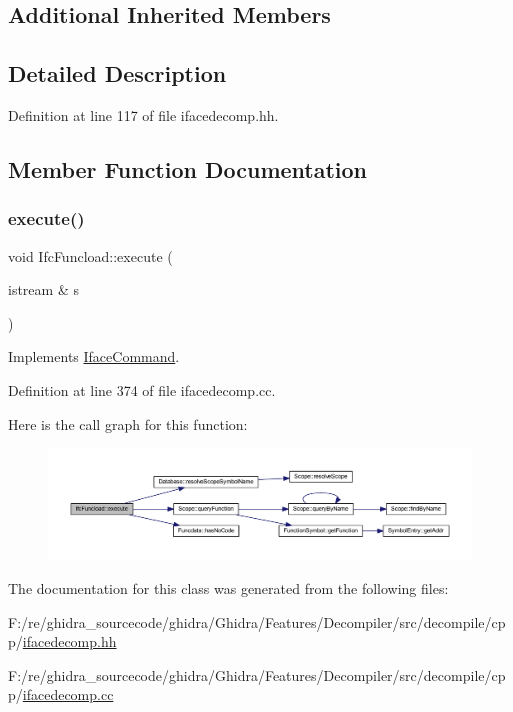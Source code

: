 \subsection*{Additional Inherited Members}


\subsection{Detailed Description}


Definition at line 117 of file ifacedecomp.\+hh.



\subsection{Member Function Documentation}
\mbox{\label{class_ifc_funcload_ae6dbe62903ed565fd45310e39b7dcb48}} 
\subsubsection{\texorpdfstring{execute()}{execute()}}
{\footnotesize\ttfamily void Ifc\+Funcload\+::execute (\begin{DoxyParamCaption}\item[{istream \&}]{s }\end{DoxyParamCaption})\hspace{0.3cm}{\ttfamily [virtual]}}



Implements \mbox{\hyperlink{class_iface_command_af10e29cee2c8e419de6efe9e680ad201}{Iface\+Command}}.



Definition at line 374 of file ifacedecomp.\+cc.

Here is the call graph for this function\+:
\nopagebreak
\begin{figure}[H]
\begin{center}
\leavevmode
\includegraphics[width=350pt]{class_ifc_funcload_ae6dbe62903ed565fd45310e39b7dcb48_cgraph}
\end{center}
\end{figure}


The documentation for this class was generated from the following files\+:\begin{DoxyCompactItemize}
\item 
F\+:/re/ghidra\+\_\+sourcecode/ghidra/\+Ghidra/\+Features/\+Decompiler/src/decompile/cpp/\mbox{\hyperlink{ifacedecomp_8hh}{ifacedecomp.\+hh}}\item 
F\+:/re/ghidra\+\_\+sourcecode/ghidra/\+Ghidra/\+Features/\+Decompiler/src/decompile/cpp/\mbox{\hyperlink{ifacedecomp_8cc}{ifacedecomp.\+cc}}\end{DoxyCompactItemize}
